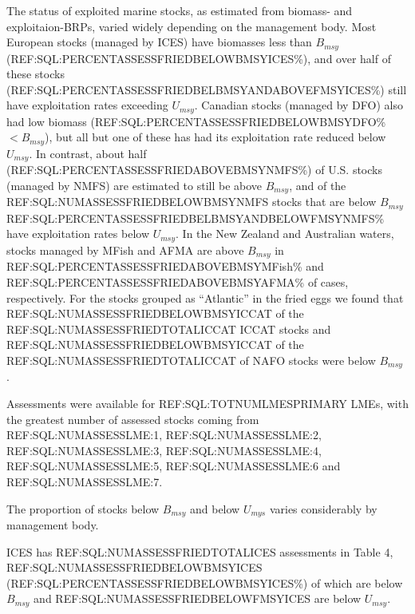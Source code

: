 The status of exploited marine stocks, as estimated from biomass- and
exploitaion-BRPs, varied widely depending on the management body. Most European stocks (managed by
ICES) have biomasses less than $B_{msy}$
(REF:SQL:PERCENTASSESSFRIEDBELOWBMSYICES\%), and over half of these
stocks (REF:SQL:PERCENTASSESSFRIEDBELBMSYANDABOVEFMSYICES\%) still
have exploitation rates exceeding $U_{msy}$. Canadian stocks (managed
by DFO) also had low biomass (REF:SQL:PERCENTASSESSFRIEDBELOWBMSYDFO\%
$< B_{msy}$), but all but one of these has had its exploitation rate
reduced below $U_{msy}$. In contrast, about half
(REF:SQL:PERCENTASSESSFRIEDABOVEBMSYNMFS\%) of U.S. stocks (managed by
NMFS) are estimated to still be above $B_{msy}$, and of the
REF:SQL:NUMASSESSFRIEDBELOWBMSYNMFS stocks that are below $B_{msy}$
REF:SQL:PERCENTASSESSFRIEDBELBMSYANDBELOWFMSYNMFS\% have exploitation
rates below $U_{msy}$. In the New
Zealand and Australian waters, stocks managed by MFish and AFMA are
above $B_{msy}$ in REF:SQL:PERCENTASSESSFRIEDABOVEBMSYMFish\% and
REF:SQL:PERCENTASSESSFRIEDABOVEBMSYAFMA\% of cases, respectively. For
the stocks grouped as ``Atlantic'' in the fried eggs we
found that REF:SQL:NUMASSESSFRIEDBELOWBMSYICCAT of the
REF:SQL:NUMASSESSFRIEDTOTALICCAT ICCAT stocks and
REF:SQL:NUMASSESSFRIEDBELOWBMSYICCAT of the
REF:SQL:NUMASSESSFRIEDTOTALICCAT of NAFO stocks were below $B_{msy}$ .



Assessments were available for REF:SQL:TOTNUMLMESPRIMARY LMEs, with the greatest number of
assessed stocks coming from REF:SQL:NUMASSESSLME:1,
REF:SQL:NUMASSESSLME:2, REF:SQL:NUMASSESSLME:3,
REF:SQL:NUMASSESSLME:4, REF:SQL:NUMASSESSLME:5, REF:SQL:NUMASSESSLME:6
and REF:SQL:NUMASSESSLME:7.

The proportion of stocks below $B_{msy}$ and below $U_{mys}$ varies considerably by management body. 

ICES has REF:SQL:NUMASSESSFRIEDTOTALICES assessments in Table 4,
REF:SQL:NUMASSESSFRIEDBELOWBMSYICES
(REF:SQL:PERCENTASSESSFRIEDBELOWBMSYICES\%) of which are below
$B_{msy}$ and REF:SQL:NUMASSESSFRIEDBELOWFMSYICES are below
$U_{msy}$.

